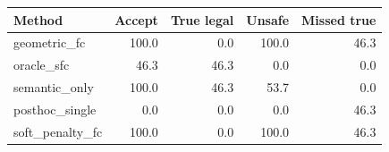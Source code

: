 \begin{tabular}{lrrrr}
\toprule
Method & Accept & True legal & Unsafe & Missed true \\
\midrule
geometric\_fc & 100.0 & 0.0 & 100.0 & 46.3 \\
oracle\_sfc & 46.3 & 46.3 & 0.0 & 0.0 \\
semantic\_only & 100.0 & 46.3 & 53.7 & 0.0 \\
posthoc\_single & 0.0 & 0.0 & 0.0 & 46.3 \\
soft\_penalty\_fc & 100.0 & 0.0 & 100.0 & 46.3 \\
\bottomrule
\end{tabular}
